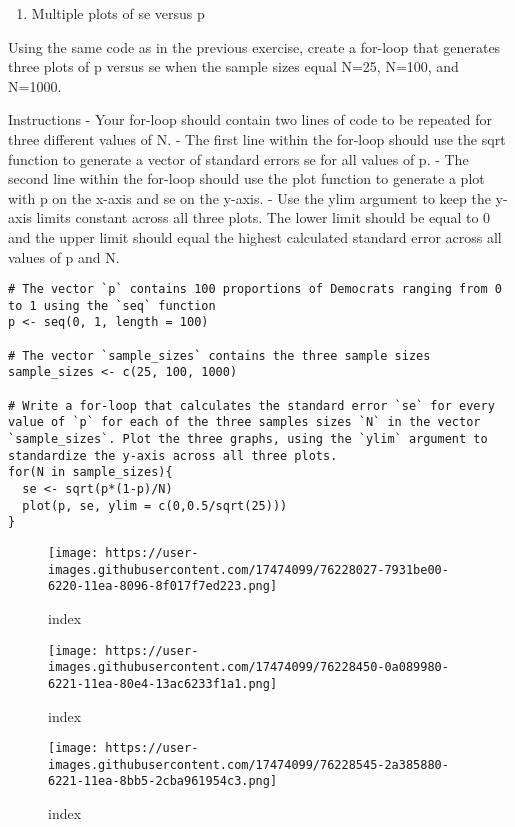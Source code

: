 \documentclass[
]{article}
\providecommand{\tightlist}{%
  \setlength{\itemsep}{0pt}\setlength{\parskip}{0pt}}
\begin{document}
\begin{enumerate}
\def\labelenumi{\arabic{enumi}.}
\setcounter{enumi}{5}
\tightlist
\item
  Multiple plots of se versus p
\end{enumerate}

Using the same code as in the previous exercise, create a for-loop that
generates three plots of p versus se when the sample sizes equal N=25,
N=100, and N=1000.

Instructions - Your for-loop should contain two lines of code to be
repeated for three different values of N. - The first line within the
for-loop should use the sqrt function to generate a vector of standard
errors se for all values of p. - The second line within the for-loop
should use the plot function to generate a plot with p on the x-axis and
se on the y-axis. - Use the ylim argument to keep the y-axis limits
constant across all three plots. The lower limit should be equal to 0
and the upper limit should equal the highest calculated standard error
across all values of p and N.

\begin{verbatim}
# The vector `p` contains 100 proportions of Democrats ranging from 0 to 1 using the `seq` function
p <- seq(0, 1, length = 100)

# The vector `sample_sizes` contains the three sample sizes
sample_sizes <- c(25, 100, 1000)

# Write a for-loop that calculates the standard error `se` for every value of `p` for each of the three samples sizes `N` in the vector `sample_sizes`. Plot the three graphs, using the `ylim` argument to standardize the y-axis across all three plots.
for(N in sample_sizes){
  se <- sqrt(p*(1-p)/N)
  plot(p, se, ylim = c(0,0.5/sqrt(25)))
}
\end{verbatim}

\begin{figure}
\centering
\texttt{[image: https://user-images.githubusercontent.com/17474099/76228027-7931be00-6220-11ea-8096-8f017f7ed223.png]}
\caption{index}
\end{figure}

\begin{figure}
\centering
\texttt{[image: https://user-images.githubusercontent.com/17474099/76228450-0a089980-6221-11ea-80e4-13ac6233f1a1.png]}
\caption{index}
\end{figure}

\begin{figure}
\centering
\texttt{[image: https://user-images.githubusercontent.com/17474099/76228545-2a385880-6221-11ea-8bb5-2cba961954c3.png]}
\caption{index}
\end{figure}
\end{document}
